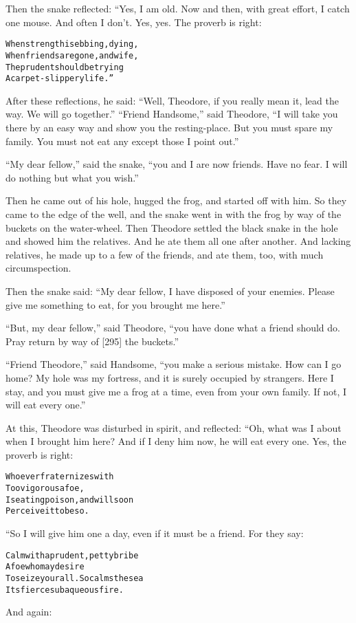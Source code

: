 \documentclass{article}
\renewenvironment{verbatim}{\begin{alltt}\normalfont\begin{centering}}{\end{centering}\end{alltt}}
\begin{document}
Then the snake reflected: “Yes, I am old. Now and then, with great
effort, I catch one mouse. And often I don't. Yes, yes. The proverb
is right:

\begin{verbatim}
When strength is ebbing, dying,
    When friends are gone, and wife,
The prudent should be trying
    A carpet-slippery life.”
\end{verbatim}
After these reflections, he said:
``Well, Theodore, if you really mean it, lead the way. We will go together.''
``Friend Handsome,'' said Theodore,
``I will take you there by an easy way and show you the resting-place. But you must spare my family. You must not eat any except those I point out.''

``My dear fellow,'' said the snake,
``you and I are now friends. Have no fear. I will do nothing but what you wish.''

Then he came out of his hole, hugged the frog, and started off with
him. So they came to the edge of the well, and the snake went in
with the frog by way of the buckets on the water-wheel. Then
Theodore settled the black snake in the hole and showed him the
relatives. And he ate them all one after another. And lacking
relatives, he made up to a few of the friends, and ate them, too,
with much circumspection.

Then the snake said:
``My dear fellow, I have disposed of your enemies. Please give me something to eat, for you brought me here.''

``But, my dear fellow,'' said Theodore,
``you have done what a friend should do. Pray return by way of [295] the buckets.''

``Friend Theodore,'' said Handsome,
``you make a serious mistake. How can I go home? My hole was my fortress, and it is surely occupied by strangers. Here I stay, and you must give me a frog at a time, even from your own family. If not, I will eat every one.''

At this, Theodore was disturbed in spirit, and reflected: “Oh, what
was I about when I brought him here? And if I deny him now, he will
eat every one. Yes, the proverb is right:

\begin{verbatim}
Whoever fraternizes with
    Too vigorous a foe,
Is eating poison, and will soon
    Perceive it to be so.
\end{verbatim}
“So I will give him one a day, even if it must be a friend. For
they say:

\begin{verbatim}
Calm with a prudent, petty bribe
    A foe who may desire
To seize your all. So calms the sea
    Its fierce subaqueous fire.
\end{verbatim}
And again:
\end{document}
